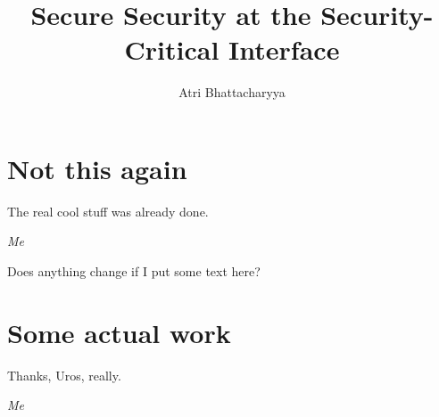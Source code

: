\documentclass[lablogo]{thesis}
\title{Secure Security at the Security-Critical Interface}
\author{Atri Bhattacharyya}
\begin{document}



\chapter{Not this again}
\label{ch:seccells}
\epigraph{The real cool stuff was already done.}%
        {\textit{Me}}

Does anything change if I put some text here?



\chapter{Some actual work}
\label{ch:midas}
\epigraph{Thanks, Uros, really.}%
        {\textit{Me}}



\appendices



\backmatter


{}

\end{document}
